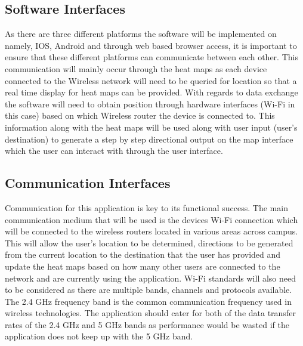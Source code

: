 \documentclass[11pt]{article}
\begin{document}
\subsection{Software Interfaces}
As there are three different platforms the software will be implemented on namely, IOS, Android and through web based browser access, it is important to ensure that these different platforms can communicate between each other. This communication will mainly occur through the heat maps as each device connected to the Wireless network will need to be queried for location so that a real time display for heat maps can be provided. With regards to data exchange the software will need to obtain position through hardware interfaces (Wi-Fi in this case) based on which Wireless router the device is connected to. This information along with the heat maps will be used along with user input (user’s destination) to generate a step by step directional output on the map interface which the user can interact with through the user interface.

\subsection{Communication Interfaces}
Communication for this application is key to its functional success. The main communication medium that will be used is the devices Wi-Fi connection which will be connected to the wireless routers located in various areas across campus. This will allow the user’s location to be determined, directions to be generated from the current location to the destination that the user has provided and update the heat maps based on how many other users are connected to the network and are currently using the application. Wi-Fi standards will also need to be considered as there are multiple bands, channels and protocols available. The 2.4 GHz frequency band is the common communication frequency used in wireless technologies. The application should cater for both of the data transfer rates of the 2.4 GHz and 5 GHz bands as performance would be wasted if the application does not keep up with the 5 GHz band.
\end{document}
